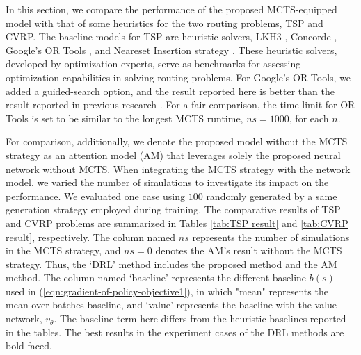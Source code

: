 \documentclass{article}
\begin{document}
In this section, we compare the performance of the proposed MCTS-equipped model with that of some heuristics for the two routing problems, TSP and CVRP.
The baseline models for TSP are heuristic solvers, LKH3 \cite{helsgaunExtensionLinKernighanHelsgaunTSP}, Concorde \cite{applegateConcordeTspSolver2019}, Google's OR Tools \cite{ortools}, and Neareset Insertion strategy \cite{nearset_insertion}. These heuristic solvers, developed by optimization experts, serve as benchmarks for assessing optimization capabilities in solving routing problems. For Google's OR Tools, we added a guided-search  option, and the result reported here is better than the result reported in previous research \cite{kwonPOMOPolicyOptimization2021, kool2018attention}. For a fair comparison, the time limit for OR Tools is set to be similar to the longest MCTS runtime, $ns=1000$, for each $n$.

For comparison, additionally, we denote the proposed model without the MCTS strategy as an attention model (AM) that leverages solely the proposed neural network without MCTS. When integrating the MCTS strategy with the network model, we varied the number of simulations to investigate its impact on the performance. We evaluated one case using $100$ randomly generated by a same generation strategy employed during training. The comparative results of TSP and CVRP problems are summarized in Tables \ref{tab:TSP result} and  \ref{tab:CVRP result}, respectively. The column named $ns$ represents the number of simulations in the MCTS strategy, and $ns=0$ denotes the AM's result without the MCTS strategy. Thus, the `DRL' method includes the proposed method and the AM method. The column named `baseline' represents the different baseline $b(s)$ used in (\ref{eqn:gradient-of-policy-objective1}), in which "mean" represents the mean-over-batches baseline, and `value' represents the baseline with the value network, $v_\theta$. The baseline term here differs from the heuristic baselines reported in the tables. The best results in the experiment cases of the DRL methods are bold-faced.
\end{document}
